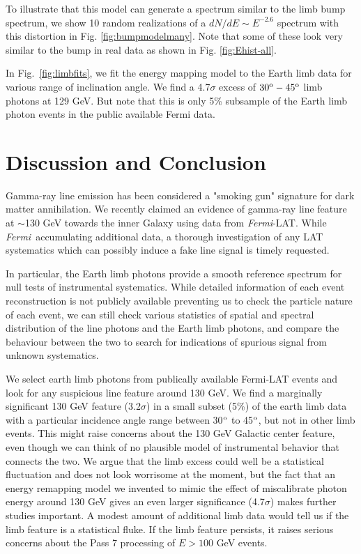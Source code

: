 \documentclass[aps,twocolumn,prd,superscriptaddress,showpacs,nofootinbib,fixfloat]{revtex4}
\newcommand{\Fermi}{{\slshape Fermi}}
\newcommand{\degree}{^{\rm o}}
\begin{document}
To illustrate that this model can generate a spectrum
similar to the limb bump spectrum, we show 10 random
realizations of a $dN/dE \sim E^{-2.6}$ spectrum with this
distortion in Fig. \ref{fig:bumpmodelmany}.  Note that some of these
look very similar to the bump in real data as shown in Fig. \ref{fig:Ehist-all}. 

In Fig.~\ref{fig:limbfits}, we fit the energy mapping model
to the Earth limb data for various range of inclination
angle. We find a 4.7$\sigma$ excess of $30\degree-45\degree$
limb photons at 129 GeV. But note that this is only 5\% subsample of the Earth limb photon events in the public available Fermi data.


\section{Discussion and Conclusion}

Gamma-ray line emission has been considered a "smoking gun" signature for dark matter annihilation. 
We recently claimed an evidence of gamma-ray line feature at
$\sim$130 GeV towards the inner Galaxy using data from
\Fermi-LAT. While \Fermi\ accumulating additional
data, a thorough investigation of any LAT systematics
which can possibly induce a fake line signal is timely requested.

In particular, the Earth limb photons provide a smooth
reference spectrum for null tests of instrumental
systematics. While detailed information of each event
reconstruction is not publicly available preventing us to
check the particle nature of each event, we can still check
various statistics of spatial and spectral distribution of
the line photons and the Earth limb photons, and compare the
behaviour between the two to search for indications of
spurious signal from unknown systematics. 

We select earth limb photons from publically available Fermi-LAT events and look for any suspicious line feature around 130 GeV.  We find a marginally significant 130 GeV feature (3.2$\sigma$) in a small
subset (5\%) of the earth limb data with a particular incidence angle range between 30$\degree$ to 45$\degree$, but not in other limb events.  This might raise concerns about
the 130 GeV Galactic center feature, even though we can
think of no plausible model of instrumental behavior that
connects the two.  We argue that the limb excess could well
be a statistical fluctuation and does not look worrisome at
the moment, but the fact that an energy remapping model we invented to mimic the effect of miscalibrate photon energy around 130 GeV
gives an even larger significance (4.7$\sigma$) makes further studies
important. A modest amount of additional limb data would
tell us if the limb feature is a statistical fluke.  If the
limb feature persists, it raises serious concerns about the
Pass 7 processing of $E > 100$ GeV events. 
\end{document}
